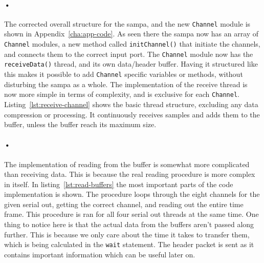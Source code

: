 \documentclass[a4paper, 12pt]{report}\dfrac{\right }{•}
\newcommand{\codeword}[1]{\texttt{#1}}
\begin{document}
\begin{minipage}{\linewidth}

\end{minipage}

\paragraph{•}
The corrected overall structure for the \gls{sampa}, and the new \codeword{Channel} module is shown in Appendix~\ref{cha:app-code}.
As seen there the \gls{sampa} now has an array of \codeword{Channel} modules, a new method called \codeword{initChannel()} that initiate the channels, and connects them to the correct input port.
The \codeword{Channel} module now has the \codeword{receiveData()} thread, and its own data/header buffer.
Having it structured like this makes it possible to add \codeword{Channel} specific variables or methods, without disturbing the \gls{sampa} as a whole.
The implementation of the receive thread is now more simple in terms of complexity, and is exclusive for each \codeword{Channel}.
Listing~\ref{lst:receive-channel} shows the basic thread structure, excluding any data compression or processing.
It continuously receives samples and adds them to the buffer, unless the buffer reach its maximum size.

\begin{minipage}{\linewidth}

\end{minipage}

\paragraph{•}
The implementation of reading from the buffer is somewhat more complicated than receiving data.
This is because the real reading procedure is more complex in itself.
In listing~\ref{lst:read-buffers} the most important parts of the code implementation is shown.
The procedure loops through the eight channels for the given serial out, getting the correct channel, and reading out the entire time frame.
This procedure is ran for all four serial out threads at the same time.
One thing to notice here is that the actual data from the buffers aren't passed along further.
This is because we only care about the time it takes to transfer them, which is being calculated in the \codeword{wait} statement.
The header packet is sent as it contains important information which can be useful later on.
\end{document}
